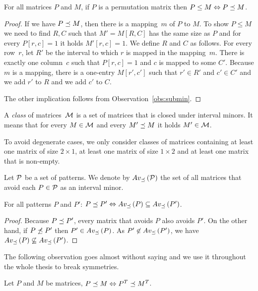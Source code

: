 \begin{obs}
\label{obs:perm}
For all matrices $P$ and $M$, if $P$ is a permutation matrix then $P\leq M\Leftrightarrow P\preceq M$.
\end{obs}
\begin{proof}
If we have $P\preceq M$, then there is a mapping~$m$ of $P$ to $M$. To show $P\leq M$ we need to find $R,C$ such that $M'=M[R,C]$ has the same size as $P$ and for every $P[r,c]=1$ it holds $M'[r,c]=1$. We define $R$ and $C$ as follows. For every row~$r$, let $R'$ be the interval to which $r$ is mapped in the mapping~$m$. There is exactly one column~$c$ such that $P[r,c]=1$ and $c$ is mapped to some $C'$. Because $m$ is a mapping, there is a one-entry $M[r',c']$ such that $r'\in R'$ and $c'\in C'$ and we add $r'$ to $R$ and we add $c'$ to $C$.

The other implication follows from Observation~\ref{obs:submin}.
\end{proof}

\begin{defn}
A \emph{class} of matrices~$\mathcal{M}$ is a set of matrices that is closed under interval minors. It means that for every $M\in\mathcal{M}$ and every $M'\preceq M$ it holds $M'\in\mathcal{M}$.
\end{defn}

To avoid degenerate cases, we only consider classes of matrices containing at least one matrix of size $2\times1$, at least one matrix of size $1\times2$ and at least one matrix that is non-empty.

\begin{defn}
Let $\mathcal{P}$ be a set of patterns. We denote by $Av_{\preceq}\left(\mathcal{P}\right)$ the set of all matrices that avoid each $P\in\mathcal{P}$ as an interval minor.
\end{defn}

\begin{obs}
\label{obs:im}
For all patterns $P$ and $P'$: $P\preceq P'\Leftrightarrow Av_{\preceq}\left(P\right)\subseteq Av_{\preceq}\left(P'\right)$.
\end{obs}
\begin{proof}
Because $P\preceq P'$, every matrix that avoids $P$ also avoids $P'$. On the other hand, if $P\not\preceq P'$ then $P'\in Av_{\preceq}\left(P\right)$. As $P'\not\in Av_{\preceq}\left(P'\right)$, we have $Av_{\preceq}\left(P\right)\not\subseteq Av_{\preceq}\left(P'\right)$.
\end{proof}

The following observation goes almost without saying and we use it throughout the whole thesis to break symmetries.

\begin{obs}
Let $P$ and $M$ be matrices, $P\preceq M\Leftrightarrow P^T\preceq M^T$.
\end{obs}

